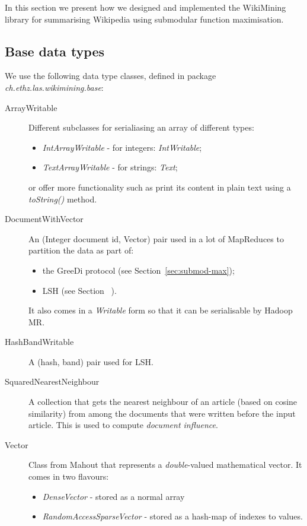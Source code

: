 In this section we present how we designed and implemented the WikiMining
library for summarising Wikipedia using submodular function maximisation.

\subsection{Base data types}

We use the following data type classes, defined in package
\emph{ch.ethz.las.wikimining.base}:
\begin{description}
  \item[ArrayWritable] Different subclasses for serialiasing an array of
  different types:
    \begin{itemize}
      \item \emph{IntArrayWritable} - for integers: \emph{IntWritable};
      \item \emph{TextArrayWritable} - for strings: \emph{Text};
    \end{itemize}
  or offer more functionality such as print its content in plain text using a
  \emph{toString()} method.
  \item[DocumentWithVector] An (Integer document id, Vector) pair used in a lot
  of MapReduces to partition the data as part of:
    \begin{itemize}
      \item the GreeDi protocol (see Section~\vref{sec:submod-max});
      \item \acl{LSH} (see Section~ ).
    \end{itemize}
    It also comes in a \emph{Writable} form so that it can be serialisable by
    Hadoop \acl{MR}.
  \item[HashBandWritable] A (hash, band) pair used for \ac{LSH}.
  \item[SquaredNearestNeighbour] A collection that gets the nearest neighbour
  of an article (based on cosine similarity) from among the documents that were
  written before the input article. This is used to compute \emph{document
  influence}.
  \item[Vector] Class from Mahout that represents a \emph{double}-valued
  mathematical vector. It comes in two flavours:
  \begin{itemize}
    \item \emph{DenseVector} - stored as a normal array
    \item \emph{RandomAccessSparseVector} - stored as a hash-map of indexes to
    values.
  \end{itemize}
\end{description}

